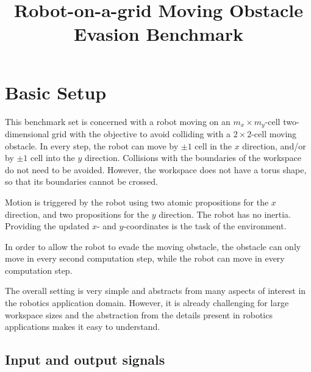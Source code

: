 \documentclass[a4paper,conference,10pt]{IEEEtran}
\author{\IEEEauthorblockN{R\"udiger Ehlers}
\IEEEauthorblockA{University of Bremen \& DFKI GmbH\\
Germany
}}
\begin{document}
\title{Robot-on-a-grid Moving Obstacle Evasion Benchmark}
\maketitle

\section{Basic Setup}

\noindent This benchmark set is concerned with a robot moving on an $m_x \times m_y$-cell two-dimensional grid with the objective to avoid colliding with a $2 \times 2$-cell moving obstacle. In every step, the robot can move by $\pm 1$ cell in the $x$ direction, and/or by $\pm 1$ cell into the $y$ direction. Collisions with the boundaries of the workspace do not need to be avoided. However, the workspace does not have a torus shape, so that its boundaries cannot be crossed.

Motion is triggered by the robot using two atomic propositions for the $x$ direction, and two propositions for the $y$ direction. The robot has no inertia. Providing the updated $x$- and $y$-coordinates is the task of the environment.

In order to allow the robot to evade the moving obstacle, the obstacle can only move in every second computation step, while the robot can move in every computation step.

The overall setting is very simple and abstracts from many aspects of interest in the robotics application domain. However, it is already challenging for large workspace sizes and the abstraction from the details present in robotics applications makes it easy to understand.

\subsection{Input and output signals}
\end{document}
